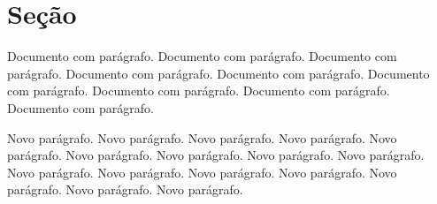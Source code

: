 \documentclass{article}
\begin{document}
	
	\section{Seção}
	
	Documento com parágrafo. Documento com parágrafo. Documento com parágrafo. Documento com parágrafo. Documento com parágrafo. Documento com parágrafo. Documento com parágrafo. Documento com parágrafo. Documento com parágrafo.
	
	Novo parágrafo. Novo parágrafo. Novo parágrafo. Novo parágrafo. Novo parágrafo. Novo parágrafo. Novo parágrafo. Novo parágrafo. Novo parágrafo. Novo parágrafo. Novo parágrafo. Novo parágrafo. Novo parágrafo. Novo parágrafo. Novo parágrafo. Novo parágrafo. 
	
\end{document}
